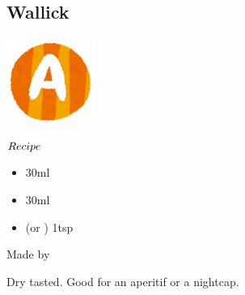 \subsection{Wallick}
\vspace{-7mm}
\hspace{27mm}
\includegraphics[scale=.12]{capital_a.png}
\vspace{2.5mm}
\begin{itembox}[l]{\boldmath $Recipe$}
\begin{itemize}
\setlength{\parskip}{0cm}
\setlength{\itemsep}{0cm}
\item \gin 30ml
\item \vermouth 30ml
\item \wc (or \oc) 1tsp
\end{itemize}
\vspace{-4mm}
Made by \stir
\end{itembox}
Dry tasted. Good for an aperitif or a nightcap.
